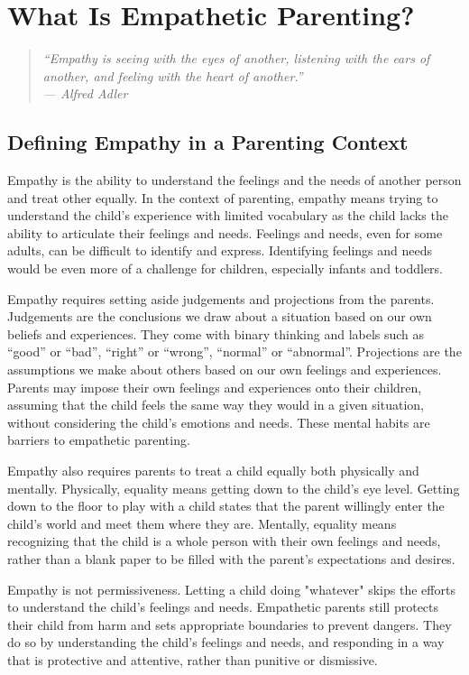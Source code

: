 \chapter{What Is Empathetic Parenting?}

\begin{quote}
\itshape ``Empathy is seeing with the eyes of another, listening with the 
ears of another, and feeling with the heart of another.''\\
\upshape --- Alfred Adler
\end{quote}
\newpage
\section{Defining Empathy in a Parenting Context}

Empathy is the ability to understand the feelings and the needs of another person and treat other equally. 
In the context of parenting, empathy means trying to understand the child's experience with limited vocabulary as the child lacks the ability to articulate their feelings and needs.
Feelings and needs, even for some adults, can be difficult to identify and express.
Identifying feelings and needs would be even more of a challenge for children, especially infants and toddlers.

Empathy requires setting aside judgements and projections from the parents.
Judgements are the conclusions we draw about a situation based on our own beliefs and experiences.
They come with binary thinking and labels such as ``good'' or ``bad'', ``right'' or ``wrong'', ``normal'' or ``abnormal''.
Projections are the assumptions we make about others based on our own feelings and experiences.
Parents may impose their own feelings and experiences onto their children, assuming that the child feels the same way they would in a given situation, without considering the child's emotions and needs.
These mental habits are barriers to empathetic parenting.

Empathy also requires parents to treat a child equally both physically and mentally.
Physically, equality means getting down to the child's eye level.
Getting down to the floor to play with a child states that the parent willingly enter the child's world and meet them where they are.
Mentally, equality means recognizing that the child is a whole person with their own feelings and needs, rather than a blank paper to be filled with the parent's expectations and desires.

Empathy is not permissiveness.
Letting a child doing "whatever" skips the efforts to understand the child's feelings and needs.
Empathetic parents still protects their child from harm and sets appropriate boundaries to prevent dangers.
They do so by understanding the child's feelings and needs, and responding in a way that is protective and attentive, rather than punitive or dismissive.

